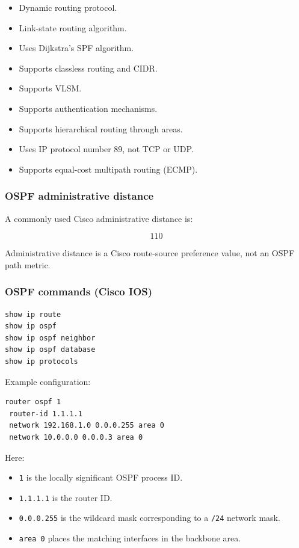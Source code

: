 \begin{itemize}
\item Dynamic routing protocol.
\item Link-state routing algorithm.
\item Uses Dijkstra's SPF algorithm.
\item Supports classless routing and CIDR.
\item Supports VLSM.
\item Supports authentication mechanisms.
\item Supports hierarchical routing through areas.
\item Uses IP protocol number 89, not TCP or UDP.
\item Supports equal-cost multipath routing (ECMP).
\end{itemize}

\subsubsection{OSPF administrative distance}

A commonly used Cisco administrative distance is:



\[
\boxed{110}
\]



Administrative distance is a Cisco route-source preference value, not an OSPF path metric.

\subsubsection{OSPF commands (Cisco IOS)}

\begin{lstlisting}
show ip route
show ip ospf
show ip ospf neighbor
show ip ospf database
show ip protocols
\end{lstlisting}

Example configuration:

\begin{lstlisting}
router ospf 1
 router-id 1.1.1.1
 network 192.168.1.0 0.0.0.255 area 0
 network 10.0.0.0 0.0.0.3 area 0
\end{lstlisting}

Here:

\begin{itemize}
\item \texttt{1} is the locally significant OSPF process ID.
\item \texttt{1.1.1.1} is the router ID.
\item \texttt{0.0.0.255} is the wildcard mask corresponding to a \texttt{/24} network mask.
\item \texttt{area 0} places the matching interfaces in the backbone area.
\end{itemize}

